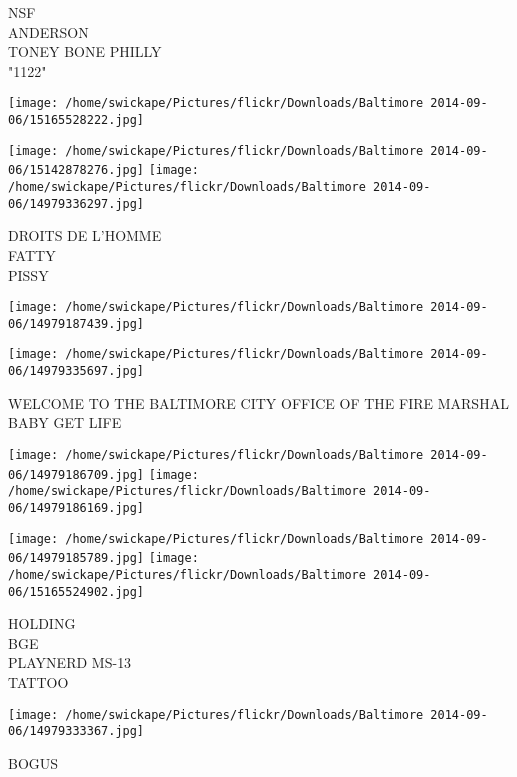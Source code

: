 \documentclass[10pt,letterpaper]{article}
\begin{document}
NSF\\
ANDERSON\\
TONEY BONE PHILLY\\
"1122"
\pagebreak

\texttt{[image: /home/swickape/Pictures/flickr/Downloads/Baltimore 2014-09-06/15165528222.jpg]}

\vspace{0.25in}
\texttt{[image: /home/swickape/Pictures/flickr/Downloads/Baltimore 2014-09-06/15142878276.jpg]}
\texttt{[image: /home/swickape/Pictures/flickr/Downloads/Baltimore 2014-09-06/14979336297.jpg]}

DROITS DE L'HOMME\\
FATTY\\
PISSY
\pagebreak

\texttt{[image: /home/swickape/Pictures/flickr/Downloads/Baltimore 2014-09-06/14979187439.jpg]}

\vspace{0.25in}
\texttt{[image: /home/swickape/Pictures/flickr/Downloads/Baltimore 2014-09-06/14979335697.jpg]}

WELCOME TO THE BALTIMORE CITY OFFICE OF THE FIRE MARSHAL\\
BABY GET LIFE
\pagebreak

\texttt{[image: /home/swickape/Pictures/flickr/Downloads/Baltimore 2014-09-06/14979186709.jpg]}
\texttt{[image: /home/swickape/Pictures/flickr/Downloads/Baltimore 2014-09-06/14979186169.jpg]}

\texttt{[image: /home/swickape/Pictures/flickr/Downloads/Baltimore 2014-09-06/14979185789.jpg]}
\texttt{[image: /home/swickape/Pictures/flickr/Downloads/Baltimore 2014-09-06/15165524902.jpg]}

HOLDING\\
BGE\\
PLAYNERD MS{-}13\\
TATTOO
\pagebreak

\texttt{[image: /home/swickape/Pictures/flickr/Downloads/Baltimore 2014-09-06/14979333367.jpg]}

BOGUS
\pagebreak
\end{document}
